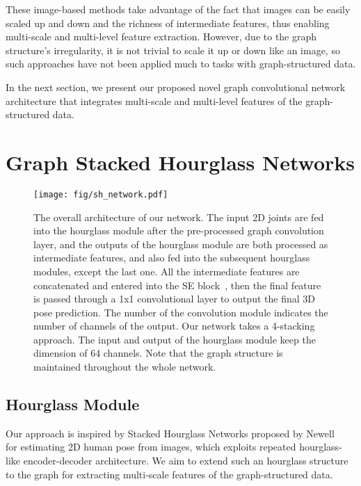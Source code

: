 \documentclass[final]{cvpr}
\begin{document}
These image-based methods take advantage of the fact that images can be easily scaled up and down and the richness of intermediate features, thus enabling multi-scale and multi-level feature extraction.
However, due to the graph structure's irregularity, it is not trivial to scale it up or down like an image, so such approaches have not been applied much to tasks with graph-structured data.

In the next section, we present our proposed novel graph convolutional network architecture that integrates multi-scale and multi-level features of the graph-structured data.


\section{Graph Stacked Hourglass Networks}

\begin{figure*}
\begin{center}
\texttt{[image: fig/sh\_network.pdf]}
\end{center}
   \caption{The overall architecture of our network. The input 2D joints are fed into the hourglass module after the pre-processed graph convolution layer, 
   and the outputs of the hourglass module are both processed as intermediate features, and also fed into the subsequent hourglass modules, except the last one. 
   All the intermediate features are concatenated and entered into the SE block~\cite{senet2018}, then the final feature is passed through a 1x1 convolutional layer to output the final 3D pose prediction.
   The number of the convolution module indicates the number of channels of the output. Our network takes a 4-stacking approach. The input and output of the hourglass module keep the dimension of 64 channels.
   Note that the graph structure is maintained throughout the whole network.}
\label{fig:sh_network}
\end{figure*}


\subsection{Hourglass Module}
Our approach is inspired by Stacked Hourglass Networks proposed by Newell~\etal~\cite{Newell2016StackedHN} for estimating 2D human pose from images,
which exploits repeated hourglass-like encoder-decoder architecture.
We aim to extend such an hourglass structure to the graph for extracting multi-scale features of the graph-structured data.
\end{document}
